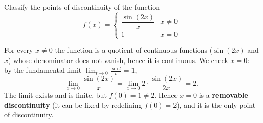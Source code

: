 
\begin{question}
Classify the points of discontinuity of the function
\[ f(x)=\begin{cases} \dfrac{\sin(2x)}{x} & x\neq 0\\[2mm] 1 & x=0 \end{cases} \]
\end{question}

\begin{solution}
For every $x\neq 0$ the function is a quotient of continuous functions ($\sin(2x)$ and $x$) whose denominator does not vanish, hence it is continuous. We check $x=0$: by the fundamental limit $\lim_{t\to0}\frac{\sin t}{t}=1$,
\[ \lim_{x\to0}\frac{\sin(2x)}{x}=\lim_{x\to0}2\cdot\frac{\sin(2x)}{2x}=2. \]
The limit exists and is finite, but $f(0)=1\neq 2$. Hence $x=0$ is a \textbf{removable discontinuity} (it can be fixed by redefining $f(0)=2$), and it is the only point of discontinuity.
\end{solution}
